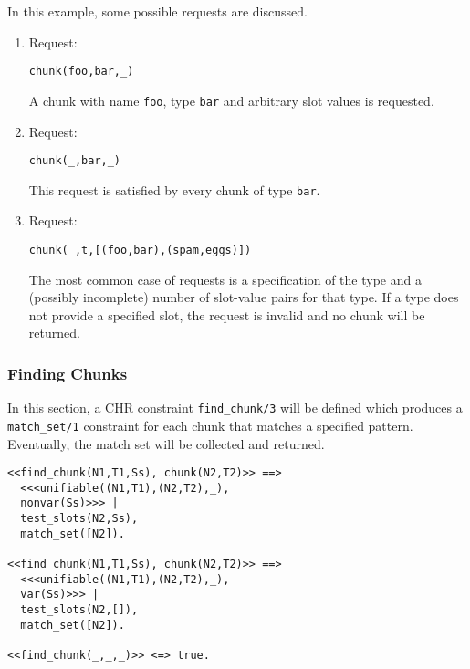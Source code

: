 \begin{example}
In this example, some possible requests are discussed.

\begin{enumerate}
 \item Request:
\begin{lstlisting}
chunk(foo,bar,_)        
\end{lstlisting}

A chunk with name \lstinline|foo|, type \lstinline|bar| and arbitrary slot values is requested.

 \item Request:
\begin{lstlisting}
chunk(_,bar,_)        
\end{lstlisting}

This request is satisfied by every chunk of type \lstinline|bar|.

 \item Request:
\begin{lstlisting}
chunk(_,t,[(foo,bar),(spam,eggs)])        
\end{lstlisting}

The most common case of requests is a specification of the type and a (possibly incomplete) number of slot-value pairs for that type. If a type does not provide a specified slot, the request is invalid and no chunk will be returned.
\end{enumerate}
\end{example}

\subsubsection{Finding Chunks}

In this section, a CHR constraint \lstinline|find_chunk/3| will be defined which produces a \lstinline|match_set/1| constraint for each chunk that matches a specified pattern. Eventually, the match set will be collected and returned.

\begin{lstlisting}
<<find_chunk(N1,T1,Ss), chunk(N2,T2)>> ==> 
  <<<unifiable((N1,T1),(N2,T2),_), 
  nonvar(Ss)>>> | 
  test_slots(N2,Ss), 
  match_set([N2]).
  
<<find_chunk(N1,T1,Ss), chunk(N2,T2)>> ==> 
  <<<unifiable((N1,T1),(N2,T2),_), 
  var(Ss)>>> | 
  test_slots(N2,[]), 
  match_set([N2]).
  
<<find_chunk(_,_,_)>> <=> true.
\end{lstlisting}

